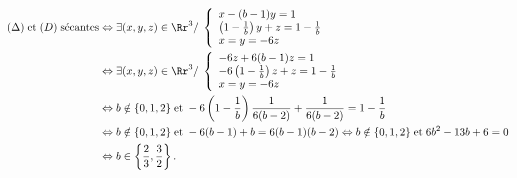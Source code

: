 {{\begin{align*}\ensuremath
(\Delta)\;\text{et}\;(D)\;\text{sécantes}&\Leftrightarrow\exists(x,y,z)\in\Rr^3/\;\left\{
\begin{array}{l}
x-(b-1)y=1\\
\left(1-\frac{1}{b}\right)y+z=1-\frac{1}{b}\\
x=y=-6z
\end{array}
\right.\\
&\Leftrightarrow\exists(x,y,z)\in\Rr^3/\;\left\{
\begin{array}{l}
-6z+6(b-1)z=1\\
-6\left(1-\frac{1}{b}\right)z+z=1-\frac{1}{b}\\
x=y=-6z
\end{array}
\right.\\
 &\Leftrightarrow b\notin\{0,1,2\}\;\text{et}\;-6\left(1-\frac{1}{b}\right)\frac{1}{6(b-2)}+\frac{1}{6(b-2)}=1-\frac{1}{b}\\
 &\Leftrightarrow b\notin\{0,1,2\}\;\text{et}\;-6(b-1)+b=6(b-1)(b-2)\Leftrightarrow b\notin\{0,1,2\}\;\text{et}\;6b^2-13b+6=0\\
 &\Leftrightarrow b\in\left\{\frac{2}{3},\frac{3}{2}\right\}.
\end{align*}

\begin{center}
\end{center}}
}